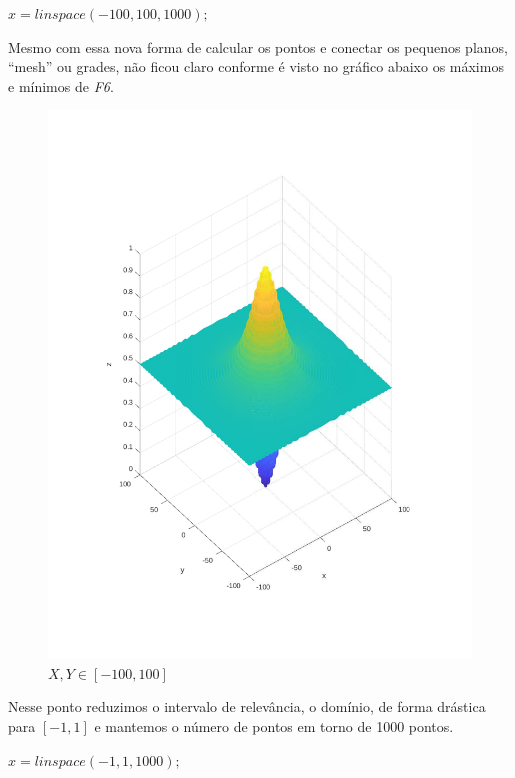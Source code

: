 \documentclass{article}
\begin{document}
$x = linspace(-100, 100, 1000);$



\newpage
\begin{flushleft}
	Mesmo com essa nova forma de calcular os pontos e conectar os
	pequenos planos, ``mesh'' ou grades, não ficou claro conforme é
	visto no gráfico abaixo os máximos e mínimos de \emph{F6}.
\end{flushleft}

\begin{figure}[h!]
\centering
\includegraphics[scale=.5]{images/myplot3.pdf}
\caption{$X,Y \in [-100, 100]$}
\label{fig:plot3_f6}
\end{figure}

Nesse ponto reduzimos o intervalo de relevância, o domínio, de forma drástica para $[-1,1]$ e mantemos o número de pontos em torno de 1000 pontos.

$x = linspace(-1, 1, 1000);$
\end{document}

